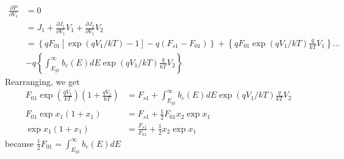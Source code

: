 \documentclass[12pt]{article}
\begin{document}
\begin{equation}
\begin{aligned}
\frac{\partial P}{\partial V_1} &= 0 \\
&= J_1 + \frac{\partial J_1}{\partial V_1} V_1 + \frac{\partial J_2}{\partial V_1} V_2 \\
&= \left \{ q F_{01} \left [ \exp (q V_1/ k T) - 1 \right ] - q (F_{s1} - F_{01}) \right \} + \left \{ q F_{01} \exp (q V_1/ k T) \frac{q}{k T} V_1 \right \} \ldots \\
& -q \left \{ \int_{E_{g1}}^{\infty} b_e(E) dE \exp (q V_{1}/ k T) \frac{q}{k T} V_2  \right \}
\end{aligned}
\end{equation}
Rearranging, we get
\begin{equation}
\begin{aligned}
F_{01} \exp (\frac{ q V_1}{ k T} ) \left ( 1 + \frac{ q V_1}{k T} \right ) & = F_{s1} + \int_{E_{g1}}^{\infty} b_e(E) dE \exp (q V_{1}/ k T) \frac{q}{k T} V_2 \\
F_{01} \exp x_1 (1 + x_1) &= F_{s1} + \frac{1}{2} F_{01} x_2 \exp x_1 \\
\exp x_1 (1 + x_1) &= \frac{F_{s1}}{F_{01}} + \frac{1}{2} x_2 \exp x_1 
\end{aligned}
\end{equation}
because $\frac{1}{2} F_{01} = \int_{E_{g1}}^{\infty} b_e(E) dE$
\end{document}
